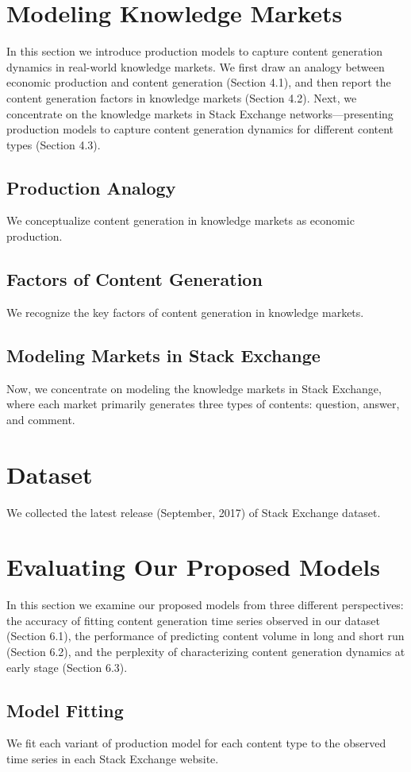 \documentclass[sigconf]{acmart}
\begin{document}
\section{Modeling Knowledge Markets}
In this section we introduce production models to capture content generation dynamics in real-world knowledge markets. We first draw an analogy between economic production and content generation (Section 4.1), and then report the content generation factors in knowledge markets (Section 4.2). Next, we concentrate on the knowledge markets in Stack Exchange networks---presenting production models to capture content generation dynamics for different content types (Section 4.3).
\subsection{Production Analogy}
We conceptualize content generation in knowledge markets as economic production.
\subsection{Factors of Content Generation}
We recognize the key factors of content generation in knowledge markets.
\subsection{Modeling Markets in Stack Exchange}
Now, we concentrate on modeling the knowledge markets in Stack Exchange, where each market primarily generates three types of contents: question, answer, and comment.

\section{Dataset}
We collected the latest release (September, 2017) of Stack Exchange dataset.

\section{Evaluating Our Proposed Models}
In this section we examine our proposed models from three different perspectives: the accuracy of fitting content generation time series observed in our dataset (Section 6.1), the performance of predicting content volume in long and short run (Section 6.2), and the perplexity of characterizing content generation dynamics at early stage (Section 6.3).
\subsection{Model Fitting}
We fit each variant of production model for each content type to the observed time series in each Stack Exchange website.
\end{document}
